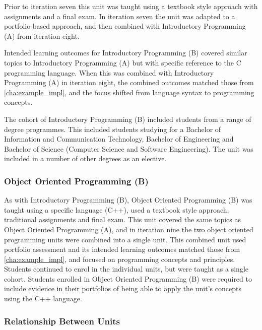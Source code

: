 Prior to iteration seven this unit was taught using a textbook style approach with assignments and a final exam. In iteration seven the unit was adapted to a portfolio-based approach, and then combined with Introductory Programming (A) from iteration eight.

Intended learning outcomes for Introductory Programming (B) covered similar topics to Introductory Programming (A) but with specific reference to the C programming language. When this was combined with Introductory Programming (A) in iteration eight, the combined outcomes matched those from \cref{cha:example_impl}, and the focus shifted from language syntax to programming concepts.

The cohort of Introductory Programming (B) included students from a range of degree programmes. This included students studying for a Bachelor of Information and Communication Technology, Bachelor of Engineering and Bachelor of Science (Computer Science and Software Engineering). The unit was included in a number of other degrees as an elective.


\subsubsection{Object Oriented Programming (B)} %
\label{ssub:object_oriented_programming_b_}

As with Introductory Programming (B), Object Oriented Programming (B) was taught using a specific language (C++), used a textbook style approach, traditional assignments and final exam. This unit covered the same topics as Object Oriented Programming (A), and in iteration nine the two object oriented programming units were combined into a single unit. This combined unit used portfolio assessment and its intended learning outcomes matched those from \cref{cha:example_impl}, and focused on programming concepts and principles. Students continued to enrol in the individual units, but were taught as a single cohort. Students enrolled in Object Oriented Programming (B) were required to include evidence in their portfolios of being able to apply the unit's concepts using the C++ language.


\subsubsection{Relationship Between Units} %
\label{ssub:relationship_between_units}

